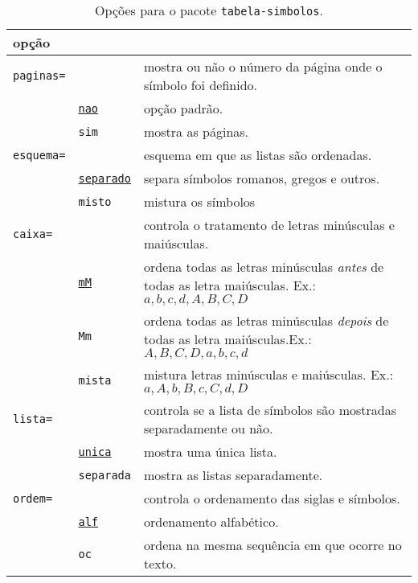 \documentclass[espacosimples]{abnt}
\begin{document}
\begin{table}[p]
\begin{center}
\begin{tabular}{llp{}}\hline\hline
opção & &\\ \hline
{\tt paginas=} & & mostra ou não o número da página onde o símbolo foi definido.\\
& \underline{\tt nao} & opção padrão.\\
& {\tt sim} & mostra as páginas.\\
\hline
{\tt esquema=} && esquema em que as listas são ordenadas.\\
& \underline{\tt separado}& separa símbolos romanos, gregos e outros.\\
& {\tt misto}& mistura os símbolos\\
\hline
{\tt caixa=} & & controla o tratamento de letras minúsculas e maiúsculas.\\
& \underline{\tt mM}& ordena todas as letras minúsculas \emph{antes} de todas as letra
maiúsculas. Ex.: $a,b,c,d,A,B,C,D$\\
& {\tt Mm}& ordena todas as letras minúsculas \emph{depois} de todas as letra
maiúsculas.Ex.: $A,B,C,D,a,b,c,d$\\
& {\tt mista}& mistura letras minúsculas e maiúsculas. Ex.: $a, A, b, B, c, C, d, D$\\
\hline
{\tt lista=} & & controla se a lista de símbolos são mostradas separadamente ou não.\\
& \underline{\tt unica} & mostra uma única lista.\\
& {\tt separada} & mostra as listas separadamente.\\
\hline
{\tt ordem=} & & controla o ordenamento das siglas e símbolos.\\
& \underline{\tt alf} & ordenamento alfabético.\\
& {\tt oc} & ordena na mesma sequência em que ocorre no texto.\\
\hline\hline
\end{tabular}
\caption{Opções para o pacote {\tt tabela-simbolos}.}
\label{opcoes}
\end{center}
\end{table}
\end{document}
